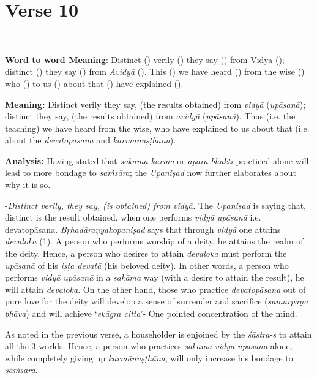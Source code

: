 \chapter{Verse 10}

\begin{moolashloka}
\\
\end{moolashloka}

\textbf{Word to word Meaning}: Distinct () verily () they say () from Vidya (); distinct () they say () from \emph{Avidyā} (). This () we have heard () from the wise () who () to us () about that () have explained ().

\textbf{Meaning:} Distinct verily they say, (the results obtained) from \emph{vidyā} (\emph{upāsanā}); distinct they say, (the results obtained) from \emph{avidyā} (\emph{upāsanā}). Thus (i.e. the teaching) we have heard from the wise, who have explained to us about that (i.e. about the \emph{devatopāsana} and \emph{karmānuṣṭhāna}).

\textbf{Analysis:} Having stated that \emph{sakāma karma} or \emph{apara-bhakti} practiced alone will lead to more bondage to \emph{saṁsāra}; the \emph{Upaniṣad} now further elaborates about why it is so.

-\emph{Distinct verily, they say, (is obtained) from vidyā.} The \emph{Upaniṣad} is saying that, distinct is the result obtained, when one performs \emph{vidyā upāsanā} i.e. devatopāsana. \emph{Bṛhadāraṇyakopaniṣad} says that through \emph{vidyā} one attains \emph{devaloka} (1). A person who performs worship of a deity, he attains the realm of the deity. Hence, a person who desires to attain \emph{devaloka} must perform the \emph{upāsanā} of his \emph{iṣṭa devatā} (his beloved deity). In other words, a person who performs \emph{vidyā upāsanā} in a \emph{sakāma} way (with a desire to attain the result), he will attain \emph{devaloka}. On the other hand, those who practice \emph{devatopāsana} out of pure love for the deity will develop a sense of surrender and sacrifice (\emph{samarpaṇa bhāva}) and will achieve `\emph{ekāgra citta}'- One pointed concentration of the mind.

As noted in the previous verse, a householder is enjoined by the \emph{śāstra-s} to attain all the 3 worlds. Hence, a person who practices \emph{sakāma vidyā upāsanā} alone, while completely giving up \emph{karmānuṣṭhāna}, will only increase his bondage to \emph{saṁsāra}.


